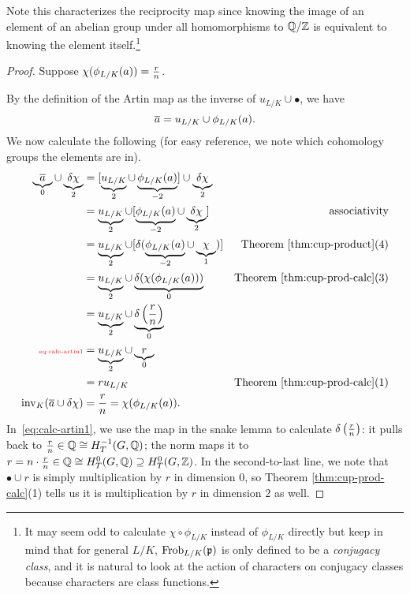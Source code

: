 Note this characterizes the reciprocity map since knowing the image of an element of an abelian group under all homomorphisms to $\mathbb{Q}/\mathbb{Z}$ is equivalent to knowing the element itself.\footnote{It may seem odd to calculate $\chi\circ \phi_{L/K}$ instead of $\phi_{L/K}$ directly but keep in mind that for general $L/K$, $\operatorname{Frob}_{L/K}(\mathfrak{p})$ is only defined to be a {\it conjugacy class}, and it is natural to look at the action of characters on conjugacy classes because characters are class functions.}
\begin{proof}
Suppose $\chi(\phi_{L/K}(a))=\frac{r}{n}$.

By the definition of the Artin map as the inverse of $u_{L/K}\cup \bullet$, we have
\[
\overline{a}
=u_{L/K}\cup \phi_{L/K}(a).
\]
We now calculate the following (for easy reference, we note which cohomology groups the elements are in). 
\begin{align}
\underbrace{\ol a}_{0}\cup \underbrace{\de \chi}_{2}
&=[\underbrace{u_{L/K}}_{2} \cup\underbrace{\phi_{L/K}(a)}_{-2}]\cup \underbrace{\de \chi}_{2}\nonumber\\
\nonumber&=\underbrace{u_{L/K}}_{2} \cup[\underbrace{\phi_{L/K}(a)}_{-2}\cup \underbrace{\de \chi}_{2}]&\text{associativity}\\
\nonumber&=\underbrace{u_{L/K}}_{2} \cup[\de(\underbrace{\phi_{L/K}(a)}_{-2}\cup \underbrace{\chi}_{1})] \nonumber&\text{Theorem~\ref{thm:cup-product}(4)}\\
\nonumber&=\underbrace{u_{L/K}}_{2} \cup \underbrace{\de(\chi(\phi_{L/K}(a)))}_{0}&\text{Theorem \ref{thm:cup-prod-calc}(3)}\\
\nonumber&=\underbrace{u_{L/K}}_{2} \cup \underbrace{\de\pf rn}_{0}\\
\llabel{eq:calc-artin1}&=\underbrace{u_{L/K}}_2\cup \underbrace{r}_{0}\\
\nonumber
&=ru_{L/K}&\text{Theorem \ref{thm:cup-prod-calc}(1)}%
\\
\nonumber\inv_K(\ol a\cup \de \chi) &= \fc rn=\chi(\phi_{L/K}(a)).
\end{align}
In~\eqref{eq:calc-artin1}, we use the map in the snake lemma to calculate $\delta\left( {\frac{r}{n}} \right)$: it pulls back to $\frac{r}{n}\in \mathbb{Q}\cong H_T^{-1}(G,\mathbb{Q})$; the norm maps it to $r=n\cdot \frac{r}{n}\in \mathbb{Q}\cong H_T^{0}(G,\mathbb{Q})\supseteq H_T^{0}(G,\mathbb{Z})$. In the second-to-last line, %
we note that $\bullet \cup r$ is simply multiplication by $r$ in dimension 0, so Theorem \ref{thm:cup-prod-calc}(1) tells us it is multiplication by $r$ in dimension $2$ as well.
%
\end{proof}
